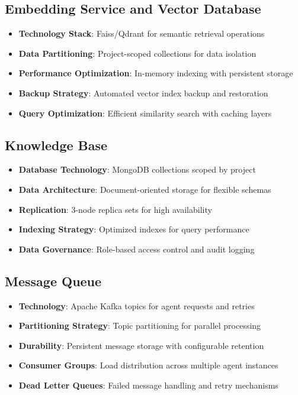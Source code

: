 \documentclass[12pt]{report}
\begin{document}
\subsection{Embedding Service and Vector Database}
\begin{itemize}
  \item \textbf{Technology Stack}: Faiss/Qdrant for semantic retrieval operations
  \item \textbf{Data Partitioning}: Project-scoped collections for data isolation
  \item \textbf{Performance Optimization}: In-memory indexing with persistent storage
  \item \textbf{Backup Strategy}: Automated vector index backup and restoration
  \item \textbf{Query Optimization}: Efficient similarity search with caching layers
\end{itemize}

\subsection{Knowledge Base}
\begin{itemize}
  \item \textbf{Database Technology}: MongoDB collections scoped by project
  \item \textbf{Data Architecture}: Document-oriented storage for flexible schemas
  \item \textbf{Replication}: 3-node replica sets for high availability
  \item \textbf{Indexing Strategy}: Optimized indexes for query performance
  \item \textbf{Data Governance}: Role-based access control and audit logging
\end{itemize}

\subsection{Message Queue}
\begin{itemize}
  \item \textbf{Technology}: Apache Kafka topics for agent requests and retries
  \item \textbf{Partitioning Strategy}: Topic partitioning for parallel processing
  \item \textbf{Durability}: Persistent message storage with configurable retention
  \item \textbf{Consumer Groups}: Load distribution across multiple agent instances
  \item \textbf{Dead Letter Queues}: Failed message handling and retry mechanisms
\end{itemize}
\end{document}
